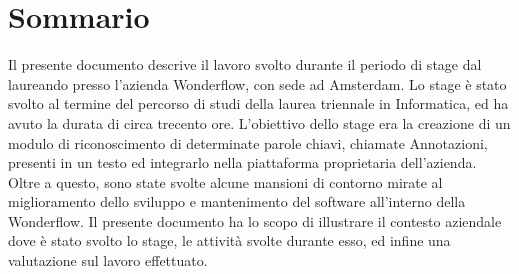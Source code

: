 \cleardoublepage
{}
\chapter*{Sommario}
\thispagestyle{empty}
Il presente documento descrive il lavoro svolto durante il periodo di stage dal 
laureando \myName presso l’azienda Wonderflow, con sede ad Amsterdam.
Lo stage è stato svolto al termine del percorso di studi della laurea triennale 
in Informatica, ed ha avuto la durata di circa trecento ore.
L’obiettivo dello stage era la creazione di un modulo di riconoscimento di 
determinate parole chiavi, chiamate \gls{Annotazioni}, presenti in un 
testo ed integrarlo nella piattaforma proprietaria dell'azienda. Oltre a 
questo, sono state svolte alcune mansioni di contorno mirate al miglioramento 
dello sviluppo e mantenimento del software all'interno della Wonderflow.
Il presente documento ha lo scopo di illustrare il contesto aziendale dove è 
stato svolto lo stage, le attività svolte durante esso, ed infine una 
valutazione sul lavoro effettuato.
\bigskip
